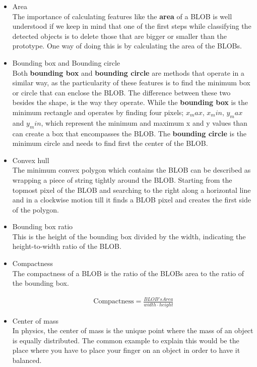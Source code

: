 \begin{itemize}
\item Area\\
The importance of calculating features like the \textbf{area} of a BLOB is well understood if we keep in mind that one of the first steps while classifying the detected objects is to delete those that are bigger or smaller than the prototype. One way of doing this is by calculating the area of the BLOBs.\\
\item Bounding box and Bounding circle\\
Both \textbf{bounding box} and \textbf{bounding circle} are methods that operate in a similar way, as the particularity of these features is to find the minimum box or circle that can enclose the BLOB. The difference between these two besides the shape, is the way they operate. While the \textbf{bounding box} is the minimum rectangle and operates by finding four pixels; $x_max$, $x_min$, $y_max$ and $y_min$, which represent the minimum and maximum x and y values than can create a box that encompasses the BLOB. The \textbf{bounding circle} is the minimum circle and needs to find first the center of the BLOB.\\
\item Convex hull\\
The minimum convex polygon which contains the BLOB can be described as wrapping a piece of string tightly around the BLOB. Starting from the topmost pixel of the BLOB and searching to the right along a horizontal line and in a clockwise motion till it finds a BLOB pixel and creates the first side of the polygon.\\
\item Bounding box ratio\\
This is the height of the bounding box divided by the width, indicating the height-to-width ratio of the BLOB.\\
\item Compactness\\
The compactness of a BLOB is the ratio of the BLOBs area to the ratio of the bounding box.

\begin{equation}
	\begin{aligned}
	\text{Compactness}=\displaystyle\frac{BLOB's Area}{width\cdot{height}}
	\label{Compact}
	\end{aligned}
\end{equation}

\item Center of mass\\
In physics, the center of mass is the unique point where the mass of an object is equally distributed. The common example to explain this would be the place where you have to place your finger on an object in order to have it balanced.


\end{itemize}
